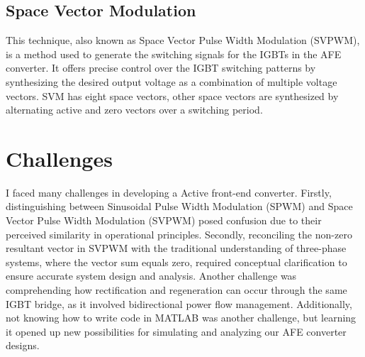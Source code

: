 \subsection{Space Vector Modulation}
This technique, also known as Space Vector Pulse Width Modulation (SVPWM), is a
method used to generate the switching signals for the IGBTs in the AFE
converter. It offers precise control over the IGBT switching patterns by
synthesizing the desired output voltage as a combination of multiple voltage
vectors. SVM has eight space vectors, other space vectors are synthesized by
alternating active and zero vectors over a switching period.

\section{Challenges}
I faced many challenges in developing a Active front-end converter. Firstly,
distinguishing between Sinusoidal Pulse Width Modulation (SPWM) and Space
Vector Pulse Width Modulation (SVPWM) posed confusion due to their perceived
similarity in operational principles. Secondly, reconciling the non-zero
resultant vector in SVPWM with the traditional understanding of three-phase
systems, where the vector sum equals zero, required conceptual clarification to
ensure accurate system design and analysis. Another challenge was comprehending
how rectification and regeneration can occur through the same IGBT bridge, as
it involved bidirectional power flow management. Additionally, not knowing how
to write code in MATLAB was another challenge, but learning it opened up new
possibilities for simulating and analyzing our AFE converter designs.